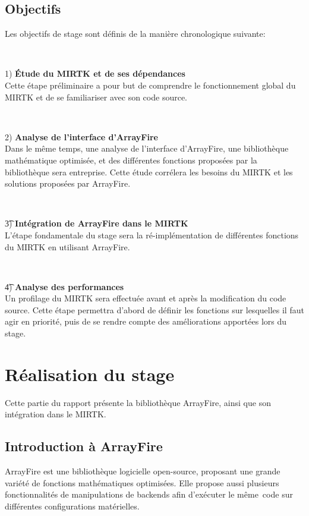 \documentclass[10pt]{report}
\begin{document}
	\section{Objectifs}
	Les objectifs de stage sont définis de la manière chronologique suivante:
	~\par~\par 
	1) \textbf{Étude du MIRTK et de ses dépendances} \\
	Cette étape préliminaire a pour but de comprendre le fonctionnement global du MIRTK et de se familiariser avec son code source. 
	~\par~\par 
	2) \textbf{Analyse de l'interface d'ArrayFire} \\
	Dans le même temps, une analyse de l'interface d'ArrayFire, une bibliothèque mathématique optimisée, et des différentes fonctions proposées par la bibliothèque sera entreprise. Cette étude corrélera les besoins du MIRTK et les solutions proposées par ArrayFire.
	~\par~\par 
	\t 3) \textbf{Intégration de ArrayFire dans le MIRTK} \\
	L'étape fondamentale du stage sera la ré-implémentation de différentes fonctions du MIRTK en utilisant ArrayFire.
	~\par~\par 
	\t 4) \textbf{Analyse des performances} \\
	Un profilage du MIRTK sera effectuée avant et après la modification du code source. Cette étape permettra d'abord de définir les fonctions sur lesquelles il faut agir en priorité, puis de se rendre compte des améliorations apportées lors du stage.
\newpage

\chapter{Réalisation du stage} \vspace{-0.5cm}
Cette partie du rapport présente la bibliothèque ArrayFire, ainsi que son intégration dans le MIRTK.
	\section{Introduction à ArrayFire}
	ArrayFire est une bibliothèque logicielle open-source, proposant une grande variété de fonctions mathématiques optimisées. Elle propose aussi plusieurs fonctionnalités de manipulations de backends afin d'exécuter le même code sur différentes configurations matérielles.
\end{document}
